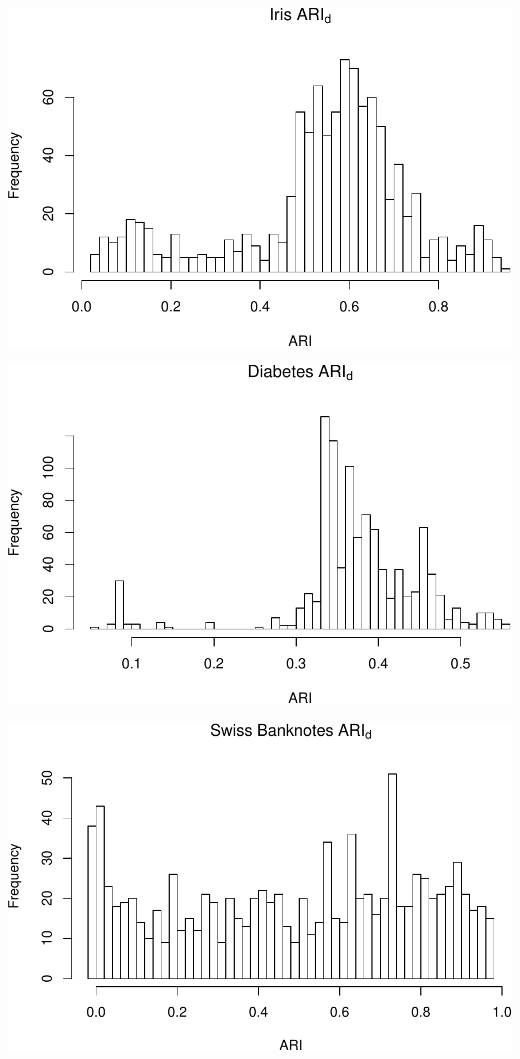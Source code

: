 \documentclass[]{article}
\begin{document}
\begin{center}\includegraphics[width=1\linewidth]{Report_files/figure-latex/unnamed-chunk-18-2} \end{center}

\begin{center}\includegraphics[width=1\linewidth]{Report_files/figure-latex/unnamed-chunk-18-3} \end{center}

\begin{center}\includegraphics[width=1\linewidth]{Report_files/figure-latex/unnamed-chunk-18-4} \end{center}
\end{document}
